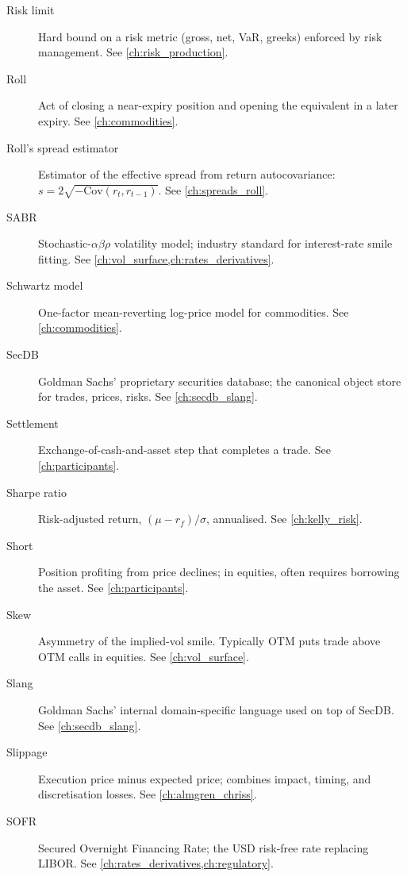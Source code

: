 \begin{description}
\item[Risk limit]
Hard bound on a risk metric (gross, net, VaR, greeks) enforced by
risk management. See \cref{ch:risk_production}.

\item[Roll]
Act of closing a near-expiry position and opening the equivalent in a
later expiry. See \cref{ch:commodities}.

\item[Roll's spread estimator]
Estimator of the effective spread from return autocovariance:
$s = 2\sqrt{-\mathrm{Cov}(r_t, r_{t-1})}$. See \cref{ch:spreads_roll}.

\item[SABR]
Stochastic-$\alpha\beta\rho$ volatility model; industry standard for
interest-rate smile fitting. See \cref{ch:vol_surface,ch:rates_derivatives}.

\item[Schwartz model]
One-factor mean-reverting log-price model for commodities. See \cref{ch:commodities}.

\item[SecDB]
Goldman Sachs' proprietary securities database; the canonical object
store for trades, prices, risks. See \cref{ch:secdb_slang}.

\item[Settlement]
Exchange-of-cash-and-asset step that completes a trade. See \cref{ch:participants}.

\item[Sharpe ratio]
Risk-adjusted return, $(\mu - r_f)/\sigma$, annualised. See \cref{ch:kelly_risk}.

\item[Short]
Position profiting from price declines; in equities, often requires
borrowing the asset. See \cref{ch:participants}.

\item[Skew]
Asymmetry of the implied-vol smile. Typically OTM puts trade above
OTM calls in equities. See \cref{ch:vol_surface}.

\item[Slang]
Goldman Sachs' internal domain-specific language used on top of SecDB.
See \cref{ch:secdb_slang}.

\item[Slippage]
Execution price minus expected price; combines impact, timing, and
discretisation losses. See \cref{ch:almgren_chriss}.

\item[SOFR]
Secured Overnight Financing Rate; the USD risk-free rate replacing
LIBOR. See \cref{ch:rates_derivatives,ch:regulatory}.


\end{description}
